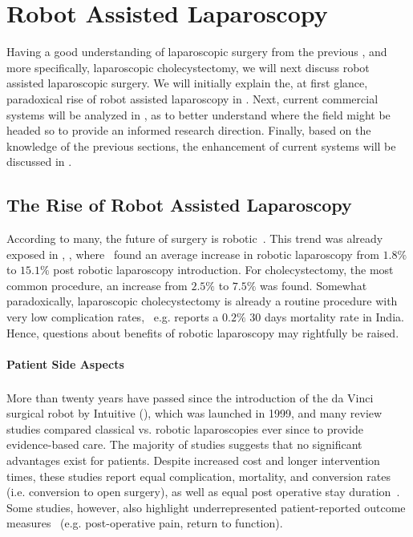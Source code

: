 \section{Robot Assisted Laparoscopy}
\label{in:sec:robot_assisted_laparoscopy}
Having a good understanding of laparoscopic surgery from the previous , and more specifically, laparoscopic cholecystectomy, we will next discuss robot assisted laparoscopic surgery. We will initially explain the, at first glance, paradoxical rise of robot assisted laparoscopy in . Next, current commercial systems will be analyzed in , as to better understand where the field might be headed so to provide an informed research direction. Finally, based on the knowledge of the previous sections, the enhancement of current systems will be discussed in .

\subsection{The Rise of Robot Assisted Laparoscopy}
\label{in:sec:the_rise_of_robot_assisted_laparoscopy}
According to many, the future of surgery is robotic~\cite{times2021better}. This trend was already exposed in , , where~\cite{sheetz2020trends} found an average increase in robotic laparoscopy from $1.8\%$ to $15.1\%$ post robotic laparoscopy introduction. For cholecystectomy, the most common procedure, an increase from $2.5\%$ to $7.5\%$ was found. Somewhat paradoxically, laparoscopic cholecystectomy is already a routine procedure with very low complication rates,~\cite{thapar2023evaluation} e.g. reports a $0.2\%$ 30 days mortality rate in India. Hence, questions about benefits of robotic laparoscopy may rightfully be raised.

\paragraph{Patient Side Aspects} More than twenty years have passed since the introduction of the da Vinci\textsuperscript{\textregistered} surgical robot by Intuitive (), which was launched in 1999, and many review studies compared classical vs. robotic laparoscopies ever since to provide evidence-based care. The majority of studies suggests that no significant advantages exist for patients. Despite increased cost and longer intervention times, these studies report equal complication, mortality, and conversion rates (i.e. conversion to open surgery), as well as equal post operative stay duration~\cite{kawka2023laparoscopic, csirzo2023robot}. Some studies, however, also highlight underrepresented patient-reported outcome measures~\cite{kawka2023laparoscopic} (e.g. post-operative pain, return to function). 


